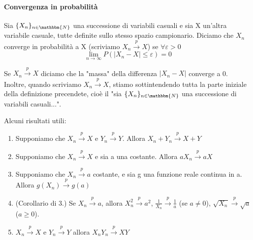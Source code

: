 \paragraph{Convergenza in probabilità}
\begin{definizione}

Sia $\{X_n\}_{n\in\mathbbm{N}}$ una successione di variabili casuali e 
sia X un'altra variabile casuale, tutte definite sullo stesso spazio campionario.
Diciamo che $X_n$ converge in probabilità a X (scriviamo $X_n\stackrel{p}{\rightarrow}X$) se $\forall\varepsilon>0$ $$\lim_{n \rightarrow\infty} P(|X_n-X|\leq\varepsilon)=0$$
\end{definizione}
\begin{oss}
Se $X_n\stackrel{p}{\rightarrow}X$ diciamo che la "massa" della differenza $|X_n-X|$ converge a 0.
Inoltre, quando scriviamo $X_n\stackrel{p}{\rightarrow}X$, stiamo sottintendendo tutta la parte iniziale della definizione precendete, cioè il "sia $\{X_n\}_{n\in\mathbbm{N}}$ una successione di variabili casuali...".
\end{oss}
\begin{teo} Alcuni risultati utili: 

\begin{enumerate}
\item Supponiamo che  $X_n\stackrel{p}{\rightarrow}X$ e  $Y_n\stackrel{p}{\rightarrow}Y$. Allora  $X_n+Y_n\stackrel{p}{\rightarrow}X+Y$
\item Supponiamo che $X_n\stackrel{p}{\rightarrow}X$ e sia a una costante. Allora $aX_n\stackrel{p}{\rightarrow}aX$ 
\item Supponiamo che  $X_n\stackrel{p}{\rightarrow}a$ costante, e sia g una funzione reale continua in a. Allora  $g(X_n)\stackrel{p}{\rightarrow}g(a)$
\item (Corollario di 3.) Se $X_n\stackrel{p}{\rightarrow}a$, allora $X_n^2\stackrel{p}{\rightarrow}a^2$, $\frac{1}{X_n}\stackrel{p}{\rightarrow}\frac{1}{a}$ (se $a\neq0$), $\sqrt{X_n}\stackrel{p}{\rightarrow}\sqrt{a}$ ($a\geq0$).
\item $X_n\stackrel{p}{\rightarrow}X$ e $Y_n\stackrel{p}{\rightarrow}Y$ allora $X_nY_n\stackrel{p}{\rightarrow}XY$
\end{enumerate}
\end{teo}
